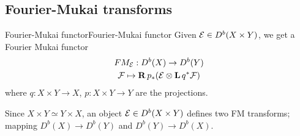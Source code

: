 
\subsection{Fourier-Mukai transforms}

\begin{definition}{Fourier-Mukai functor}{Fourier-Mukai functor}
    Given $\mathcal{E}\in D^b(X\times Y)$, we get a Fourier Mukai functor $$\begin{gathered}
    FM_{\mathcal{E}}:D^b(X)\to D^b(Y)\\
    \mathcal{F}\mapsto \operatorname{\mathbf{R}} p_{*}(\mathcal{E}\otimes \operatorname{\mathbf{L}} q^*\mathcal{F})
    \end{gathered}$$
    where $q:X\times Y\to X$, $p:X\times Y\to Y$ are the projections.
\end{definition}



\begin{remark}{}{}
    Since $X\times Y\simeq Y\times X$, an object $\mathcal{E}\in D^b(X\times Y)$
    defines two FM transforms; mapping $D^b(X)\to D^b(Y)$ and
    $D^b(Y)\to D^b(X)$.
\end{remark}

